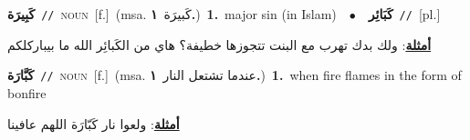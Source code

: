 \documentclass[10pt,a4paper,twoside]{article} %
\begin{document}
\begin{multicols}{2}
{{{{{{{{{{{{{\setlength\topsep{0pt}\textbf{\foreignlanguage{arabic}{كَبِيرَة}}\ {\color{gray}\texttt{//}\color{black}}\ \textsc{noun}\ [f.]\ \color{gray}(msa. \foreignlanguage{arabic}{كَبيرَة}~\foreignlanguage{arabic}{\textbf{١.}})\color{black}\ \textbf{1.}~major sin (in Islam)\ \ $\bullet$\ \ \setlength\topsep{0pt}\textbf{\foreignlanguage{arabic}{كَبَائِر}}\ {\color{gray}\texttt{//}\color{black}}\ [pl.]\  \begin{flushright}\color{gray}\foreignlanguage{arabic}{\textbf{\underline{\foreignlanguage{arabic}{أمثلة}}}: ولك بدك تهرب مع البنت تتجوزها خطيفة؟ هاي من الكَبائِر الله ما بيباركلكم}\end{flushright}\color{black}} \vspace{2mm}

{\setlength\topsep{0pt}\textbf{\foreignlanguage{arabic}{كَبَّارَة}}\ {\color{gray}\texttt{//}\color{black}}\ \textsc{noun}\ [f.]\ \color{gray}(msa. \foreignlanguage{arabic}{عندما تشتعل النار}~\foreignlanguage{arabic}{\textbf{١.}})\color{black}\ \textbf{1.}~when fire flames in the form of bonfire\  \begin{flushright}\color{gray}\foreignlanguage{arabic}{\textbf{\underline{\foreignlanguage{arabic}{أمثلة}}}: ولعوا نار كَبّارَة اللهم عافينا}\end{flushright}\color{black}} \vspace{2mm}

}}}}}}}}}}}}
\end{multicols}
\end{document}
